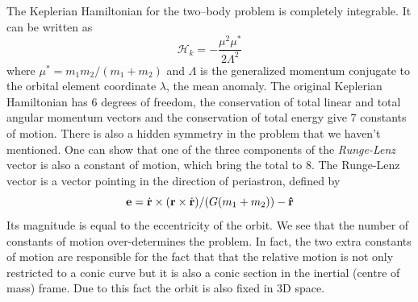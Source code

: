 The Keplerian Hamiltonian for the two--body problem is completely 
integrable. It can be written as
\begin{equation}
    \mathcal{H}_k=- \frac{\mu^2\mu^*}{2\Lambda^2} 
\end{equation}
where $\mu^*=m_1m_2/(m_1+m_2)$ and $\Lambda$ is the generalized
momentum conjugate to the orbital element coordinate $\lambda$,
the mean anomaly. The original Keplerian Hamiltonian has 6 
degrees of freedom, the conservation of total linear and total
angular momentum vectors and the conservation of total energy
give 7 constants of motion. There is also a hidden symmetry in
the problem that we haven't mentioned. One can show that
one of the three components of the 
\emph{Runge-Lenz} vector is also a constant of motion, which 
bring the total to 8. The Runge-Lenz vector is a vector pointing
in the direction of periastron, defined by
\begin{equation}
    \boldsymbol{\mathbf{e}}=\dot{\boldsymbol{\mathbf{r}}}\times(\boldsymbol{\mathbf{r}}\times\dot{\boldsymbol{\mathbf{r}}})
    /(G(m_1+m_2)) - \boldsymbol{\mathbf{\hat r}}
\end{equation}
Its magnitude is equal to the eccentricity of the orbit. We 
see that the number of constants of motion over-determines the 
problem. In fact, the two extra constants of motion are responsible
for the fact that that the relative motion is not only restricted to 
a conic curve but it is also a conic section in the inertial
(centre of mass) frame. Due to this fact the orbit is also fixed in
3D space.

